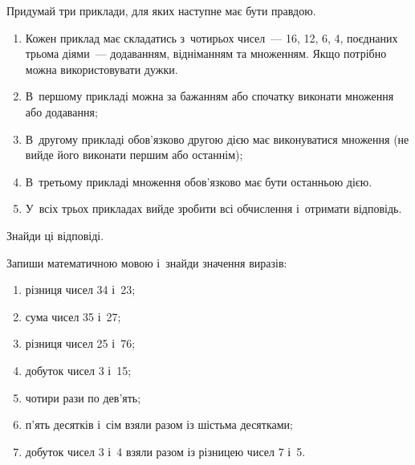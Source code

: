 \problem
Придумай три приклади, для яких наступне має бути правдою.
\begin{enumerate}
  \item Кожен приклад має складатись з~чотирьох чисел~--- 16, 12, 6, 4,
  поєднаних трьома діями~--- додаванням, відніманням та множенням.
  Якщо потрібно можна використовувати дужки.
  \item В~першому прикладі можна за бажанням або
  спочатку виконати множення або додавання;
  \item В~другому прикладі обов'язково другою дією має
  виконуватися множення (не вийде його виконати першим або останнім);
  \item В~третьому прикладі множення обов'язково має бути останньою дією.
  \item У~всіх трьох прикладах вийде зробити всі обчислення і~отримати відповідь.
\end{enumerate}
Знайди ці відповіді.


\problem
Запиши математичною мовою і~знайди значення виразів:
\begin{enumerate}
  \item різниця чисел 34 і~23;
  \item сума чисел 35 і~27;
  \item різниця чисел 25 і~76;
  \item добуток чисел 3 і~15;
  \item чотири рази по дев'ять;
  \item п'ять десятків і~сім взяли разом із шістьма десятками;
  \item добуток чисел 3 і~4 взяли разом із різницею чисел 7 і~5.
\end{enumerate}


